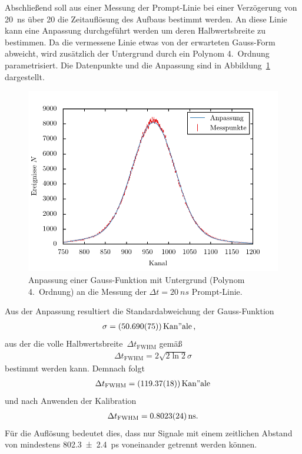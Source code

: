 \documentclass[11pt, a4paper]{article}
\numberwithin{equation}{section}
\begin{document}
Abschließend soll aus einer Messung der Prompt-Linie bei einer Verzögerung von \SI{20}{ns} über \SI{20}{\min} die Zeitauflösung des Aufbaus bestimmt werden.
An diese Linie kann eine Anpassung durchgeführt werden um deren Halbwertsbreite zu bestimmen.
Da die vermessene Linie etwas von der erwarteten Gauss-Form abweicht, wird zusätzlich der Untergrund durch ein Polynom 4.\ Ordnung parametrisiert.
Die Datenpunkte und die Anpassung sind in Abbildung~\ref{fig:promptkurve_einzeln} dargestellt.
\begin{figure}[h]
	\centering
	\includegraphics{./figures/fwhm_fit.pdf}
	\caption{Anpassung einer Gauss-Funktion mit Untergrund (Polynom 4.\ Ordnung) an die Messung der $\Delta t = \SI{20}{ns}$ Prompt-Linie.}
	\label{fig:promptkurve_einzeln}
\end{figure}
Aus der Anpassung resultiert die Standardabweichung der Gauss-Funktion
\begin{align*}
	\sigma &= (\num{50.690 +- 0.075}) \, \mathrm{Kan"ale} \, \text{,}
\end{align*}
aus der die volle Halbwertsbreite~$\Delta t_\mathrm{FWHM}$ gemäß
\begin{align*}
	\Delta t_\mathrm{FWHM} = 2 \sqrt{2\ln 2} \sigma
\end{align*}
bestimmt werden kann.
Demnach folgt
\begin{align*}
	\Delta t_\mathrm{FWHM} = (\num{119.37 +- 0.18}) \, \mathrm{Kan"ale}
\end{align*}
und nach Anwenden der Kalibration
\begin{align*}
	\Delta t_\mathrm{FWHM} = \SI{0.8023 +- 0.0024}{\nano\second} \text{.}
\end{align*}
Für die Auflösung bedeutet dies, dass nur Signale mit einem zeitlichen Abstand von mindestens \SI{802.3 +- 2.4}{\pico\second} voneinander getrennt werden können.
\end{document}
